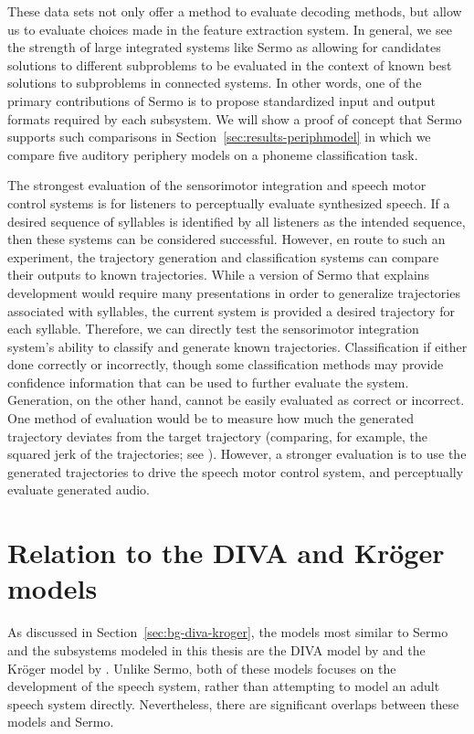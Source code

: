 These data sets not only offer a method
to evaluate decoding methods,
but allow us to evaluate choices made
in the feature extraction system.
In general, we see the strength
of large integrated systems like Sermo
as allowing for candidates solutions
to different subproblems
to be evaluated in the context of
known best solutions
to subproblems in connected systems.
In other words,
one of the primary contributions of Sermo
is to propose standardized input and output formats
required by each subsystem.
We will show a proof of concept
that Sermo supports such comparisons
in Section~\ref{sec:results-periphmodel}
in which we compare
five auditory periphery models
on a phoneme classification task.

The strongest evaluation
of the sensorimotor integration
and speech motor control systems
is for listeners to perceptually evaluate
synthesized speech.
If a desired sequence of syllables
is identified by all listeners
as the intended sequence,
then these systems can be considered successful.
However, en route to such an experiment,
the trajectory generation and classification systems
can compare their outputs to known trajectories.
While a version of Sermo
that explains development
would require many presentations
in order to generalize trajectories
associated with syllables,
the current system
is provided a desired trajectory
for each syllable.
Therefore, we can directly
test the sensorimotor integration system's
ability to classify
and generate known trajectories.
Classification if either done
correctly or incorrectly,
though some classification methods
may provide confidence information
that can be used to further evaluate the system.
Generation, on the other hand,
cannot be easily evaluated
as correct or incorrect.
One method of evaluation would be to
measure how much the generated trajectory
deviates from the target trajectory
(comparing, for example,
the squared jerk of the trajectories;
see \cite{hogan2009}).
However, a stronger evaluation
is to use the generated trajectories
to drive the speech motor control system,
and perceptually evaluate generated audio.

\section{Relation to the DIVA and Kr\"{o}ger models}

As discussed in Section~\ref{sec:bg-diva-kroger},
the models most similar to Sermo
and the subsystems modeled in this thesis
are the DIVA model by \citeauthor{guenther1995}
and the Kr\"{o}ger model by \citeauthor{kroger2009}.
Unlike Sermo, both of these models
focuses on the development of the speech system,
rather than attempting to model
an adult speech system directly.
Nevertheless, there are significant overlaps
between these models and Sermo.

